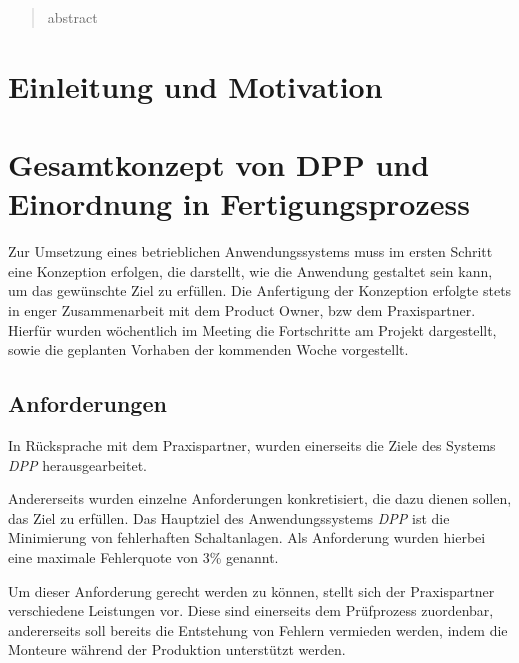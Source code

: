 \documentclass[
    type=Projektarbeit,
    status=draft, %
    language=german, %
    bibengine=bibtex,
]{unibwm-inf-thesis}
\begin{document}
    \tableofcontents

    \mainmatter
    \begin{abstract}
        abstract
    \end{abstract}


    \chapter{Einleitung und Motivation}


    \chapter{Gesamtkonzept von DPP und Einordnung in Fertigungsprozess}
    Zur Umsetzung eines betrieblichen Anwendungssystems muss im ersten Schritt eine Konzeption erfolgen, die darstellt,
    wie die Anwendung gestaltet sein kann, um das gewünschte Ziel zu erfüllen.
    Die Anfertigung der Konzeption erfolgte stets in enger Zusammenarbeit mit dem Product Owner, bzw dem Praxispartner.
    Hierfür wurden wöchentlich im Meeting die Fortschritte am Projekt dargestellt, sowie die geplanten Vorhaben der kommenden Woche vorgestellt.

    \section{Anforderungen}
    In Rücksprache mit dem Praxispartner, wurden einerseits die Ziele des Systems \textit{DPP} herausgearbeitet.

    Andererseits wurden einzelne Anforderungen konkretisiert, die dazu dienen sollen, das Ziel zu erfüllen.
    Das Hauptziel des Anwendungssystems \textit{DPP} ist die Minimierung von fehlerhaften Schaltanlagen.
    Als Anforderung wurden hierbei eine maximale Fehlerquote von 3\% genannt.

    Um dieser Anforderung gerecht werden zu können, stellt sich der Praxispartner verschiedene Leistungen vor.
    Diese sind einerseits dem Prüfprozess zuordenbar, andererseits soll bereits die Entstehung von Fehlern vermieden
    werden, indem die Monteure während der Produktion unterstützt werden.
\end{document}
